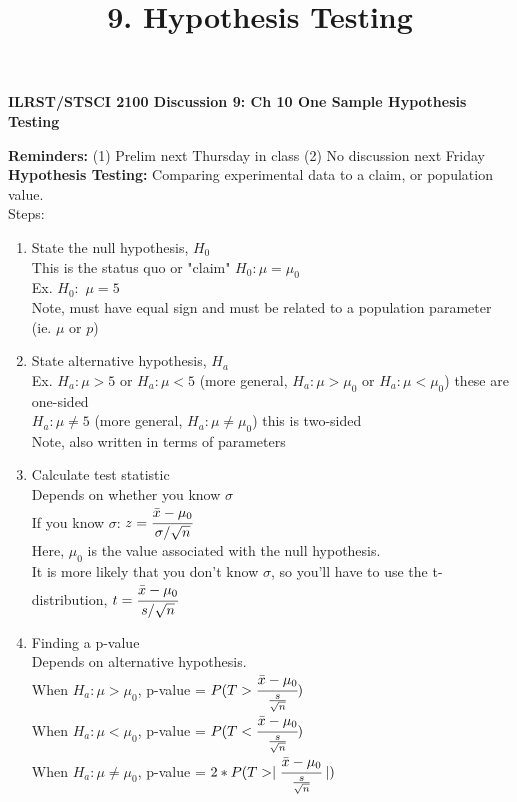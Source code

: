 \documentclass[12pt]{article}
\begin{document}
\title{9. Hypothesis Testing}
\begin{center} \textbf{ILRST/STSCI 2100 Discussion 9: Ch 10 One Sample Hypothesis Testing}
\end{center}
 
\noindent \textbf{Reminders:} (1) Prelim next Thursday in class (2) No discussion next Friday \\

\noindent \textbf{Hypothesis Testing:} Comparing experimental data to a claim, or population value. \\
\noindent Steps:
\begin{enumerate}
\item State the null hypothesis, $H_{0}$\\
This is the status quo or "claim"
$H_{0}: \mu = \mu_{0}$\\
 Ex. $H_{0}:$ $\mu = 5$ \\
Note, must have equal sign and must be related to a population parameter (ie. $\mu$ or $p$)
\item State alternative hypothesis, $H_{a}$\\
Ex. $H_{a}: \mu > 5$ or $H_{a}: \mu < 5$ (more general, $H_{a}: \mu > \mu_{0}$ or $H_{a}: \mu < \mu_{0}$) these are one-sided \\
\hspace*{.73cm} $H_{a}: \mu \neq 5$ (more general, $H_{a}: \mu \neq \mu_{0}$) this is two-sided\\
Note, also written in terms of parameters
\item Calculate test statistic \\
Depends on whether you know $\sigma$\\
If you know $\sigma$: $z=\cfrac{\bar{x}-\mu_{0}}{\sigma/\sqrt{n}}$\\
Here, $\mu_{0}$ is the value associated with the null hypothesis.\\
It is more likely that you don't know $\sigma$, so you'll have to use the t-distribution, $t=\cfrac{\bar{x}-\mu_{0}}{s/\sqrt{n}}$

\item Finding a p-value\\
Depends on alternative hypothesis.\\
When $H_{a}: \mu > \mu_{0}$, p-value = $P(T>\cfrac{\bar{x}-\mu_{0}}{\frac{s}{\sqrt{n}}})$\\
When $H_{a}: \mu < \mu_{0}$, p-value = $P(T<\cfrac{\bar{x}-\mu_{0}}{\frac{s}{\sqrt{n}}})$\\
When $H_{a}: \mu \neq \mu_{0}$, p-value = $2*P(T > \mid \cfrac{\bar{x}-\mu_{0}}{\frac{s}{\sqrt{n}}}\mid)$\\


\end{enumerate}
\end{document}
